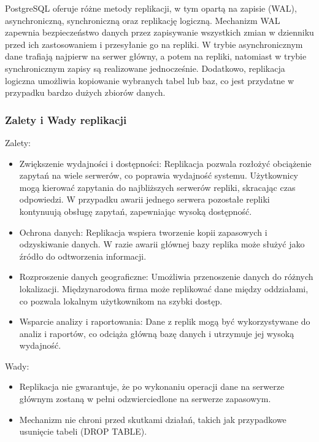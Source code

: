 \documentclass[letterpaper,10pt,polish]{sphinxmanual}
\begin{document}
\sphinxAtStartPar
PostgreSQL oferuje różne metody replikacji, w tym opartą na zapisie (WAL), asynchroniczną, synchroniczną oraz replikację logiczną. Mechanizm WAL zapewnia bezpieczeństwo danych przez zapisywanie wszystkich zmian w dzienniku przed ich zastosowaniem i przesyłanie go na repliki. W trybie asynchronicznym dane trafiają najpierw na serwer główny, a potem na repliki, natomiast w trybie synchronicznym zapisy są realizowane jednocześnie. Dodatkowo, replikacja logiczna umożliwia kopiowanie wybranych tabel lub baz, co jest przydatne w przypadku bardzo dużych zbiorów danych.


\subsubsection{Zalety i Wady replikacji}
\label{\detokenize{rozdzial2/Wydajnosc_Skalowanie_i_Replikacja/index:zalety-i-wady-replikacji}}
\sphinxAtStartPar
Zalety:
\begin{itemize}
\item {} 
\sphinxAtStartPar
Zwiększenie wydajności i dostępności: Replikacja pozwala rozłożyć obciążenie zapytań na wiele serwerów, co poprawia wydajność systemu. Użytkownicy mogą kierować zapytania do najbliższych serwerów repliki, skracając czas odpowiedzi. W przypadku awarii jednego serwera pozostałe repliki kontynuują obsługę zapytań, zapewniając wysoką dostępność.

\item {} 
\sphinxAtStartPar
Ochrona danych: Replikacja wspiera tworzenie kopii zapasowych i odzyskiwanie danych. W razie awarii głównej bazy replika może służyć jako źródło do odtworzenia informacji.

\item {} 
\sphinxAtStartPar
Rozproszenie danych geograficzne: Umożliwia przenoszenie danych do różnych lokalizacji. Międzynarodowa firma może replikować dane między oddziałami, co pozwala lokalnym użytkownikom na szybki dostęp.

\item {} 
\sphinxAtStartPar
Wsparcie analizy i raportowania: Dane z replik mogą być wykorzystywane do analiz i raportów, co odciąża główną bazę danych i utrzymuje jej wysoką wydajność.

\end{itemize}

\sphinxAtStartPar
Wady:
\begin{itemize}
\item {} 
\sphinxAtStartPar
Replikacja nie gwarantuje, że po wykonaniu operacji dane na serwerze głównym zostaną w pełni odzwierciedlone na serwerze zapasowym.

\item {} 
\sphinxAtStartPar
Mechanizm nie chroni przed skutkami działań, takich jak przypadkowe usunięcie tabeli (DROP TABLE).

\end{itemize}
\end{document}
